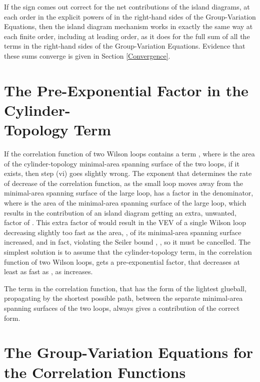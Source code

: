 \documentclass[a4paper,12pt,oneside]{article}
\begin{document}
If the sign comes out correct for the net contributions of the island 
diagrams, at each order in the explicit powers of \coordHE{} in
the right-hand sides of the Group-Variation Equations, then the island
diagram mechanism works in exactly the same way at each finite order, including at 
leading order, as it does for the full sum of all the terms in the
right-hand sides of the Group-Variation Equations.  Evidence that these
sums converge is given in Section \ref{Convergence}.

\section{The Pre-Exponential Factor in the Cylinder-\\Topology Term}

If the correlation function of two Wilson loops contains a term \coordHE{}, where \coordHE{} is the area of the cylinder-topology minimal-area spanning
surface of the two loops, if it exists, then step (vi) goes slightly wrong.
The exponent that determines the rate of decrease of the correlation
function, as the small loop moves away from the minimal-area spanning
surface of the large loop, has a factor \coordHE{} in the 
denominator, where \coordHE{} is the area of the minimal-area spanning 
surface of the large loop,
which results in the contribution of an island diagram getting an extra,
unwanted, factor of \coordHE{}.  This extra factor of \coordHE{}
would result in the VEV of a single Wilson loop decreasing slightly too fast
as the area, \coordHE{}, of its minimal-area spanning surface increased, and in fact,
violating the Seiler bound \cite{Seiler}, \cite{Simon Yaffe}, so it must be cancelled.  The simplest solution
is to assume that the cylinder-topology term, in the correlation function of
two Wilson loops, gets a pre-exponential factor, that decreases at least as
fast as \coordHE{}, as \coordHE{} increases.

The term in the correlation
function, that has the form of the lightest glueball, propagating by the
shortest possible path, between the separate minimal-area spanning surfaces
of the two loops, always gives a contribution of the correct form.

\section{The Group-Variation Equations for the Correlation Functions}
\end{document}
